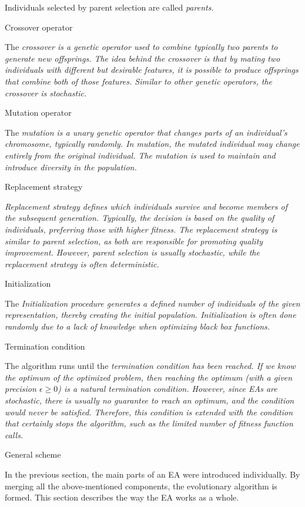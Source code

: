 Individuals selected by parent selection are called \em parents\em.

\secc Crossover operator

The \em crossover \em is a genetic operator used to combine typically two parents to
generate new offsprings. The idea behind the crossover is that by mating two
individuals with different but desirable features, it is possible to produce offsprings
that combine both of those features. Similar to other genetic operators, the crossover is
stochastic.

\secc Mutation operator

The \em mutation \em is a unary genetic operator that changes parts of an individual's
chromosome, typically randomly. In mutation, the mutated individual may change entirely from
the original individual. The mutation is used to maintain and introduce diversity in the
population.

\secc Replacement strategy

\em Replacement strategy \em defines which individuals survive and become members of the
subsequent generation. Typically, the decision is based on the quality of individuals,
preferring those with higher fitness. The replacement strategy is similar to parent
selection, as both are responsible for promoting quality improvement. However,
parent selection is usually stochastic, while the replacement strategy is often
deterministic.


\secc Initialization

The \em Initialization \em procedure generates a defined number of individuals of the
given representation, thereby creating the initial population. Initialization is
often done randomly due to a lack of knowledge when optimizing black box functions.


\secc Termination condition

The algorithm runs until the \em termination condition \em has been reached. If we
know the optimum of the optimized problem, then reaching the optimum (with a given
precision $\epsilon \geq  0$) is a natural termination condition. However, since EAs
are stochastic, there is usually no guarantee to reach an optimum, and the condition
would never be satisfied. Therefore, this condition is extended with the condition that
certainly stops the algorithm, such as the limited number of fitness function calls.


\sec General scheme

In the previous section, the main parts of an EA were introduced individually.
By merging all the above-mentioned components, the evolutionary algorithm is formed.
This section describes the way the EA works as a whole.

